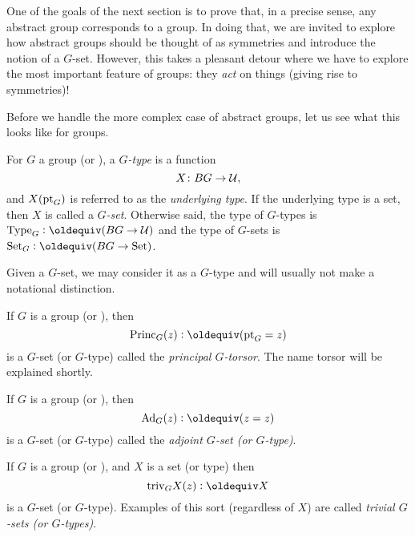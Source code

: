 One of the goals of the next section is to prove that, in a precise sense, any abstract group corresponds to a group.  In doing that, we are invited to explore how abstract groups should be thought of as symmetries and introduce the notion of a $G$-set.  However, this takes a pleasant detour where we have to explore the most important feature of groups: they \emph{act} on things (giving rise to symmetries)!

Before we handle the more complex case of abstract groups, let us see what this looks like for groups.

\begin{definition}
  For $G$ a group (or \inftygp), a \emph{$G$-type} is a function
  $$X\colon BG\to\mathcal{U},$$
and $X({\mathord{\mathrm{pt}}}_G)$ is referred to as the \emph{underlying type}.
If the underlying type is a set, then $X$ is called a \emph{$G$-set}.
Otherwise said, the type of $G$-types is $\Type_G\defequi(BG\to\UU)$ and the type of $G$-sets is $\Set_G\defequi(BG\to\Set)$.
\end{definition}
Given a $G$-set, we may consider it as a $G$-type and will usually not make a notational distinction.

\begin{example}\label{def:principaltorsor}
  If $G$ is a group (or \inftygp), then
$$\princ_G(z)\defequi(\pt_G=z)$$ is a $G$-set (or $G$-type) called the \emph{principal $G$-torsor}.  The name torsor will be explained shortly.
\end{example}

\newcommand{\Ad}{\mathrm{Ad}}
\begin{example}\label{def:adjointrep}
  If $G$ is a group (or \inftygp), then
$$\Ad_G(z)\defequi(z=z)$$ is a $G$-set (or $G$-type) called the \emph{adjoint $G$-set (or $G$-type)}.
\end{example}
\begin{example}\label{def:trivGset}
  If $G$ is a group (or \inftygp), and $X$ is a set (or type) then
$$\mathrm{triv}_GX(z)\defequi X$$ is a $G$-set (or $G$-type).  Examples of this sort (regardless of $X$) are called \emph{trivial $G$-sets (or $G$-types)}.
\end{example}

